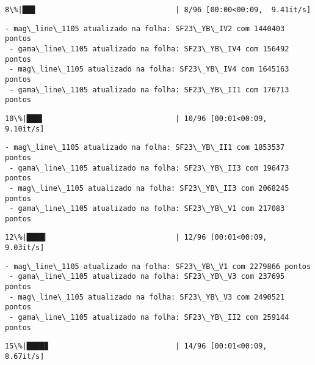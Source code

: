 \documentclass[11pt]{article}
\begin{document}
    \begin{Verbatim}[commandchars=\\\{\}]
  8\%|██▉                                | 8/96 [00:00<00:09,  9.41it/s]
    \end{Verbatim}

    \begin{Verbatim}[commandchars=\\\{\}]
 - mag\_line\_1105 atualizado na folha: SF23\_YB\_IV2 com 1440403 pontos
 - gama\_line\_1105 atualizado na folha: SF23\_YB\_IV4 com 156492 pontos
 - mag\_line\_1105 atualizado na folha: SF23\_YB\_IV4 com 1645163 pontos
 - gama\_line\_1105 atualizado na folha: SF23\_YB\_II1 com 176713 pontos
    \end{Verbatim}

    \begin{Verbatim}[commandchars=\\\{\}]
 10\%|███▌                              | 10/96 [00:01<00:09,  9.10it/s]
    \end{Verbatim}

    \begin{Verbatim}[commandchars=\\\{\}]
 - mag\_line\_1105 atualizado na folha: SF23\_YB\_II1 com 1853537 pontos
 - gama\_line\_1105 atualizado na folha: SF23\_YB\_II3 com 196473 pontos
 - mag\_line\_1105 atualizado na folha: SF23\_YB\_II3 com 2068245 pontos
 - gama\_line\_1105 atualizado na folha: SF23\_YB\_V1 com 217083 pontos
    \end{Verbatim}

    \begin{Verbatim}[commandchars=\\\{\}]
 12\%|████▎                             | 12/96 [00:01<00:09,  9.03it/s]
    \end{Verbatim}

    \begin{Verbatim}[commandchars=\\\{\}]
 - mag\_line\_1105 atualizado na folha: SF23\_YB\_V1 com 2279866 pontos
 - gama\_line\_1105 atualizado na folha: SF23\_YB\_V3 com 237695 pontos
 - mag\_line\_1105 atualizado na folha: SF23\_YB\_V3 com 2490521 pontos
 - gama\_line\_1105 atualizado na folha: SF23\_YB\_II2 com 259144 pontos
    \end{Verbatim}

    \begin{Verbatim}[commandchars=\\\{\}]
 15\%|████▉                             | 14/96 [00:01<00:09,  8.67it/s]
    \end{Verbatim}
\end{document}
